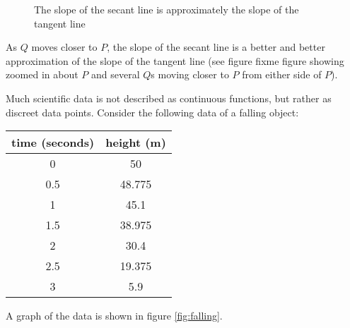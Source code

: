 \begin{figure}[htbp]
    \centering
    \caption{The slope of the secant line is approximately the slope of the 
    tangent line}
    \label{fig:secant}
\end{figure}

As $Q$ moves closer to $P$, the slope of the secant line is a better and 
better approximation of the slope of the tangent line (see figure fixme figure showing zoomed in about $P$ and several $Q$s moving closer to $P$ from either side of $P$). 

Much scientific data is not described as continuous functions, but rather as 
discreet data points. Consider the following data of a falling object:
\begin{center}
\begin{tabular}{|c|c|}
\hline
time (seconds) & height (m)\\\hline
0 & 50\\\hline
0.5 & 48.775\\\hline
1 & 45.1\\\hline
1.5 & 38.975\\\hline
2 & 30.4\\\hline
2.5 & 19.375\\\hline
3 & 5.9 \\\hline
\end{tabular}
\end{center}

A graph of the data is shown in figure \ref{fig:falling}.

